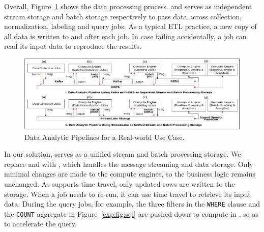 Overall, Figure~\ref{exp:fig:case} shows the data processing process.  \kafka and \hdfs serves as independent stream storage and batch storage respectively to pass data across collection, normalization, labeling and query jobs.
 As a typical ETL practice, a new copy of all data is written to \hdfs and \kafka after each job. In case  failing accidentally, a job can read its input data to reproduce the results.
 
 
 \begin{figure}[htbp]
 	\includegraphics[scale=1.05]{figures/case}
 	\centering
 	\vspace{-1em}
 	\caption{Data Analytic Pipelines for a  Real-world Use Case.}
 	\label{exp:fig:case}
 \end{figure}
 
  In our solution, \sys serves as a unified stream and batch processing storage. 
  We replace \kafka and \hdfs with \sys, which handles the message streaming and data storage. 
  Only minimal changes are made to the compute engines, so the business logic remains unchanged. 
  As \sys supports time travel, only updated rows are written to the storage. When a job needs to re-run, it can use time travel to retrieve its input data.  During the query jobs, for example, the three filters in the \texttt{WHERE} clause and the \texttt{COUNT} aggregate in Figure~\ref{exp:fig:sql} are pushed down to compute in \sys, so as to  accelerate the query.


